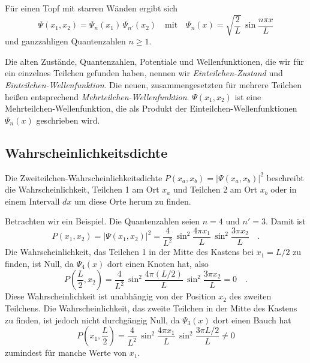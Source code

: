 Für einen Topf mit starren Wänden ergibt sich
\begin{equation}
    \Psi(x_1, x_2) = \Psi_{n}(x_1) \, \Psi_{n'}(x_2) \quad
    \text{mit} \quad \Psi_n(x) = \sqrt{\frac{2}{L}} \, \sin \frac{n \pi x}{L}
\end{equation}
und ganzzahligen Quantenzahlen $n \ge 1$.

Die alten Zustände, Quantenzahlen, Potentiale und Wellenfunktionen, die wir für ein einzelnes Teilchen gefunden haben, nennen wir \emph{Einteilchen-Zustand} und \emph{Einteilchen-Wellenfunktion}. Die neuen, zusammengesetzten für mehrere Teilchen heißen entsprechend \emph{Mehrteilchen-Wellenfunktion}. $\Psi(x_1, x_2)$ ist eine Mehrteilchen-Wellenfunktion, die als Produkt der Einteilchen-Wellenfunktionen $ \Psi_n(x)$ geschrieben wird.

\subsection{Wahrscheinlichkeitsdichte}

Die Zweiteilchen-Wahrscheinlichkeitsdichte $P(x_a, x_b) = | \Psi(x_a, x_b)|^2$ beschreibt die Wahrscheinlichkeit, Teilchen 1 am Ort $x_a$ und Teilchen 2 am Ort $x_b$ oder in einem Intervall $dx$ um diese Orte herum zu finden.

Betrachten wir ein Beispiel. Die Quantenzahlen seien $n = 4$ und $n' = 3$. Damit ist 
\begin{equation}
    P(x_1, x_2) = |  \Psi(x_1, x_2)|^2 = \frac{4}{L^2} \, \sin^2 \frac{4 \pi x_1}{L} \, \sin^2 \frac{3 \pi x_2}{L} \quad .
\end{equation}
Die Wahrscheinlichkeit, das Teilchen 1 in der Mitte des Kastens bei $x_1 = L/2$ zu finden, ist Null, da $\Psi_4(x)$ dort einen Knoten hat, also 
\begin{equation}
    P\left(\frac{L}{2}, x_2\right) = \frac{4}{L^2} \, \sin^2 \frac{4 \pi (L/2)}{L} \, \sin^2 \frac{3 \pi x_2}{L}  = 0 \quad .
\end{equation}
Diese Wahrscheinlichkeit ist unabhängig von der Position $x_2$ des zweiten Teilchens. Die Wahrscheinlichkeit, das zweite Teilchen in der Mitte des Kastens zu finden, ist jedoch nicht durchgängig Null, da $\Psi_3(x)$ dort einen Bauch hat
\begin{equation}
    P\left(x_1, \frac{L}{2}\right) = \frac{4}{L^2} \, \sin^2 \frac{4 \pi x_1}{L} \, \sin^2 \frac{3 \pi L/2}{L}  \neq 0
\end{equation}
zumindest für manche Werte von $x_1$.


